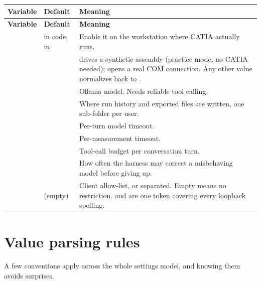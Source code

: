 \begin{longtable}{L{0.30\textwidth} L{0.20\textwidth} L{0.38\textwidth}}
\toprule
\textbf{Variable} & \textbf{Default} & \textbf{Meaning} \\
\midrule
\endfirsthead
\toprule
\textbf{Variable} & \textbf{Default} & \textbf{Meaning} \\
\midrule
\endhead
\bottomrule
\endfoot
{} &  in code,  in
 & Enable it on the workstation where CATIA actually
runs. \\
 &  &  drives a synthetic
assembly (practice mode, no CATIA needed);  opens a real COM
connection. Any other value normalizes back to . \\
 &  & Ollama model. Needs
reliable tool calling. \\
 &  & Where run
history and exported  files are written, one sub-folder per user. \\
 &  & Per-turn model
timeout. \\
 &  & Per-measurement
timeout. \\
 &  & Tool-call budget per conversation
turn. \\
 &  & How often the harness may correct a
misbehaving model before giving up. \\
 & (empty) & Client allow-list, \code{;} or
\code{,} separated. Empty means no restriction.  and
 are one token covering every loopback spelling. \\
\end{longtable}

\section{Value parsing rules}

A few conventions apply across the whole settings model, and knowing them avoids
surprises.

